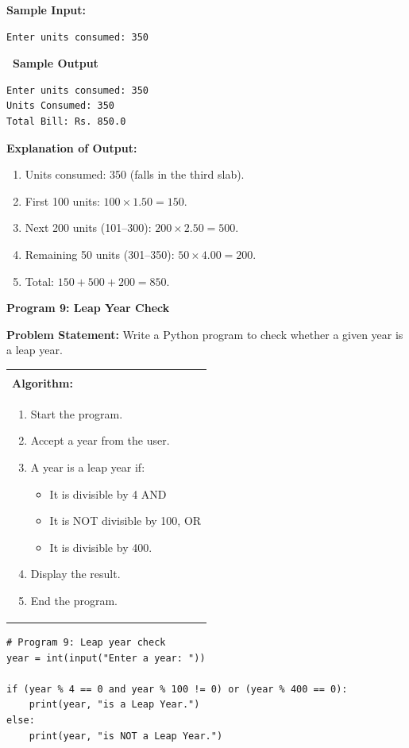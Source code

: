 \documentclass[12pt,a4paper]{article}
\makeatletter
\newcommand{\outhead}{\noindent\colorbox{cmrgreen!25}%
  {\textbf{\small\color{cmrdark}~Sample Output~}}\par\vspace{-1pt}}
\newenvironment{algobox}{%
  \par\vspace{4pt}%
  \noindent\begin{tabular}{@{}p{\linewidth}@{}}%
  \hline\\[-8pt]%
  \textbf{\color{blue!60!black}\small Algorithm:}\\[2pt]%
}{%
  \\[-4pt]\hline%
  \end{tabular}\par\vspace{4pt}%
}
\makeatother
\begin{document}
\textbf{Sample Input:}
\begin{verbatim}
Enter units consumed: 350
\end{verbatim}

\outhead
\begin{lstlisting}[style=outputstyle]
Enter units consumed: 350
Units Consumed: 350
Total Bill: Rs. 850.0
\end{lstlisting}

\textbf{Explanation of Output:}
\begin{enumerate}
  \item Units consumed: 350 (falls in the third slab).
  \item First 100 units: $100 \times 1.50 = 150$.
  \item Next 200 units (101--300): $200 \times 2.50 = 500$.
  \item Remaining 50 units (301--350): $50 \times 4.00 = 200$.
  \item Total: $150 + 500 + 200 = 850$.
\end{enumerate}

\vspace{0.5cm}

\textbf{Program 9: Leap Year Check}

\textbf{Problem Statement:}
Write a Python program to check whether a given year is a leap year.

\begin{algobox}
\begin{enumerate}[label=Step \arabic*:]
  \item Start the program.
  \item Accept a year from the user.
  \item A year is a leap year if:
    \begin{itemize}
      \item It is divisible by 4 AND
      \item It is NOT divisible by 100, OR
      \item It is divisible by 400.
    \end{itemize}
  \item Display the result.
  \item End the program.
\end{enumerate}
\end{algobox}

\begin{lstlisting}
# Program 9: Leap year check
year = int(input("Enter a year: "))

if (year % 4 == 0 and year % 100 != 0) or (year % 400 == 0):
    print(year, "is a Leap Year.")
else:
    print(year, "is NOT a Leap Year.")
\end{lstlisting}
\end{document}

